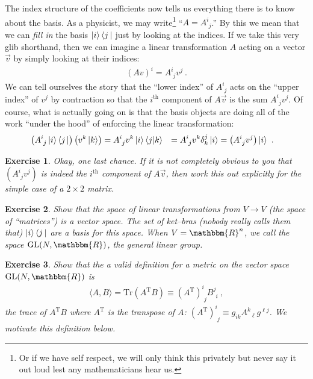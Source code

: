 \documentclass[
  11pt,
	colorful,
	raggedright,
]{tufte-style-thesis-flip}
\newtheorem{exercise}{Exercise}[section]
\newcommand{\aij}[2]{^{#1}_{\phantom{#1}#2}}
\begin{document}
The index structure of the coefficients now tells us everything there is to know about the basis. As a physicist, we may write\footnote{Or if we have self respect, we will only think this privately but never say it out loud lest any mathematicians hear us.} ``$A = A\aij{i}{j}$.'' By this we mean that we can \emph{fill in} the basis $\left|i\right\rangle\left\langle j\,\right|$ just by looking at the indices. If we take this very glib shorthand, then we can imagine a linear transformation $A$ acting on a vector $\vec{v}$ by simply looking at their indices:
\begin{align}
 (Av)^i = A\aij{i}{j} v^j  \ .
\end{align}
We can tell ourselves the story that the ``lower index'' of $A\aij{i}{j}$ acts on the ``upper index'' of $v^j$ by contraction so that the $i^\text{th}$ component of $A\vec{v}$ is the sum $A\aij{i}{j} v^j$. Of course, what is actually going on is that the basis objects are doing all of the work ``under the hood'' of enforcing the linear transformation:
\begin{align}
  \left(A\aij{i}{j}\ket{i}\bra{j}\right) \left(v^k\ket{k}\right)
  &= A\aij{i}{j} v^k \ket{i} \langle j | k \rangle
  &= A\aij{i}{j} v^k \delta^j_k \ket{i}
  &= \left(A\aij{i}{j} v^j\right) \ket{i} \ .
\end{align}

\begin{exercise}
Okay, one last chance. If it is not completely obvious to you that $\left(A\aij{i}{j} v^j\right)$ is indeed the $i^\text{th}$ component of $A\vec{v}$, then work this out explicitly for the simple case of a $2\times 2$ matrix.
\end{exercise}

\begin{exercise}\label{ex:matrices:as:vectors}
Show that the space of linear transformations from $V\to V$ (the space of ``matrices'') is a vector space. The set of ket--bras (nobody really calls them that) $\left|i\right\rangle\left\langle j\,\right|$ are a basis for this space. When $V=\mathbbm{R}^n$, we call the space $\text{GL}(N, \mathbbm{R})$, the \emph{general linear group}.
\end{exercise}

\begin{exercise}
Show that the a valid definition for a metric on the vector space $\text{GL}(N,\mathbbm{R})$ is 
\begin{align}
\langle A , B \rangle = \text{Tr}\left(A^\text{T} B\right) \equiv \left(A^\text{T}\right)\aij{i}{j}B\aij{j}{i} \ , 
\end{align}
the trace of $A^\text{T} B$ where $A^\text{T}$ is the transpose of $A$: $\left(A^\text{T}\right)\aij{i}{j} \equiv g_{ik}A\aij{k}{\ell}g^{\ell j}$. We motivate this definition below. 
\end{exercise} 
\end{document}
